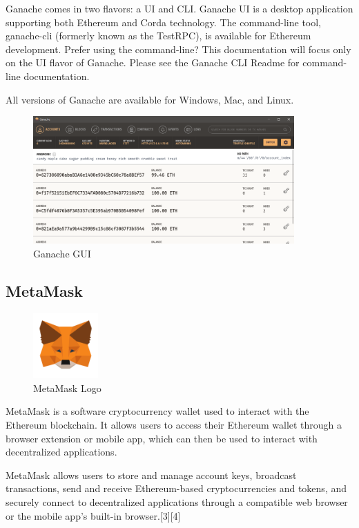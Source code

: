 Ganache comes in two flavors: a UI and CLI. Ganache UI is a desktop application supporting both Ethereum and Corda technology. The command-line tool, ganache-cli (formerly known as the TestRPC), is available for Ethereum development. Prefer using the command-line? This documentation will focus only on the UI flavor of Ganache. Please see the Ganache CLI Readme for command-line documentation.

All versions of Ganache are available for Windows, Mac, and Linux\cite{GanacheOverviewDocumentation}.

\begin{figure}[H]
	\centering
		\includegraphics[width=10cm]{images/chapter3/ganache-window.png}
		\caption{{\footnotesize Ganache GUI}}
\end{figure}

\subsection{MetaMask}

\begin{figure}
	\vspace{-10pt}
	\includegraphics[width=2.5cm]{images/chapter3/metamask-logo.png}
	\vspace{-10pt}
	\caption{{\footnotesize MetaMask Logo}}
\end{figure}

MetaMask is a software cryptocurrency wallet used to interact with the Ethereum blockchain.\cite{schroederCryptoWalletMetaMask2020} It allows users to access their Ethereum wallet through a browser extension or mobile app, which can then be used to interact with decentralized applications.

MetaMask allows users to store and manage account keys, broadcast transactions, send and receive Ethereum-based cryptocurrencies and tokens, and securely connect to decentralized applications through a compatible web browser or the mobile app's built-in browser.[3][4]

